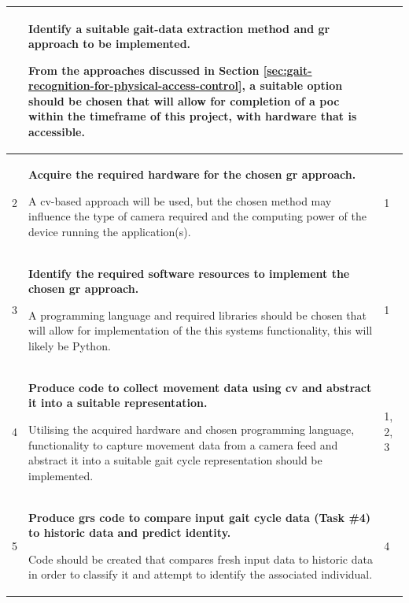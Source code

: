 \begin{scriptsize}
\begin{longtable}[c]{|p{}|p{}|p{}|}
        \endhead
        \hline
        \endfoot
        1           & \textbf{Identify a suitable gait-data extraction method and \ac{gr} approach to be implemented.}                                                           \par From the approaches discussed in Section \ref{sec:gait-recognition-for-physical-access-control}, a suitable option should be chosen that will allow for completion of a \ac{poc} within the timeframe of this project, with hardware that is accessible. &                       \\ \hline
        2           & \textbf{Acquire the required hardware for the chosen \ac{gr} approach.}                                                        \par A \ac{cv}-based approach will be used, but the chosen method may influence the type of camera required and the computing power of the device running the application(s).                                                                                                             & 1                     \\ \hline
        3           & \textbf{Identify the required software resources to implement the chosen \ac{gr} approach.}                           \par A programming language and required libraries should be chosen that will allow for implementation of the this systems functionality, this will likely be Python.                                                                                                                              & 1                     \\
        4           & \textbf{Produce code to collect movement data using \ac{cv} and abstract it into a suitable representation.}                          \par Utilising the acquired hardware and chosen programming language, functionality to capture movement data from a camera feed and abstract it into a suitable gait cycle representation should be implemented.                                                                   & 1, 2, 3               \\ \hline
        5           & \textbf{Produce \ac{grs} code to compare input gait cycle data (Task \#4) to historic data and predict identity.}                           \par Code should be created that compares fresh input data to historic data in order to classify it and attempt to identify the associated individual.                                                                                                                       & 4                     \\ \hline

\end{longtable}
\end{scriptsize}
